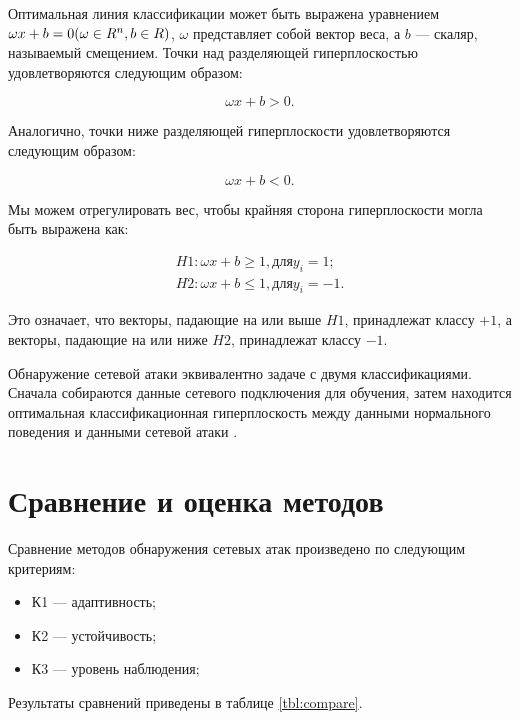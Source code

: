 Оптимальная линия классификации может быть выражена уравнением $\omega x + b = 0 \space (\omega \in R^n, b \in R)$, $\omega$ представляет собой вектор веса, а $b$ --- скаляр, называемый смещением. Точки над разделяющей гиперплоскостью удовлетворяются следующим образом:

\begin{equation}
    \omega x + b > 0.
\end{equation}

Аналогично, точки ниже разделяющей гиперплоскости удовлетворяются следующим образом:

\begin{equation}
    \omega x + b < 0.
\end{equation}

Мы можем отрегулировать вес, чтобы крайняя сторона гиперплоскости могла быть выражена как:

\begin{equation}
    \begin{split}
    H1 : \omega x + b \ge 1, для y_i = 1; \\
    H2 : \omega x + b \le 1, для y_i = -1.
    \end{split}
\end{equation}

Это означает, что векторы, падающие на или выше $H1$, принадлежат классу $+1$, а векторы, падающие на или ниже $H2$, принадлежат классу $-1$.

Обнаружение сетевой атаки эквивалентно задаче с двумя классификациями. Сначала собираются данные сетевого подключения для обучения, затем находится оптимальная классификационная гиперплоскость между данными нормального поведения и данными сетевой атаки \cite{thirteen}.



\section{Сравнение и оценка методов}

Сравнение методов обнаружения сетевых атак произведено по следующим критериям:

\begin{itemize}
    \item К1 --- адаптивность;
    \item К2 --- устойчивость;
    \item К3 --- уровень наблюдения;
\end{itemize}

Результаты сравнений приведены в таблице \ref{tbl:compare}.

